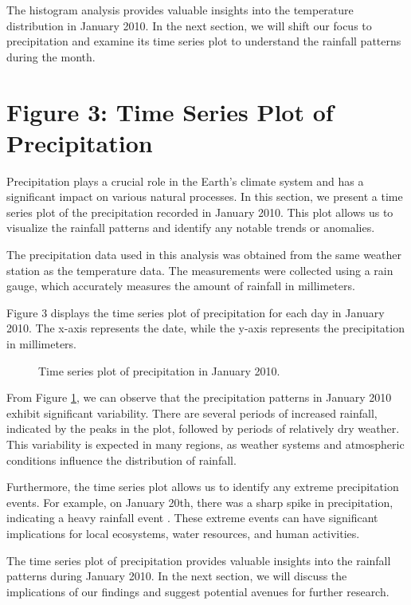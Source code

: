 \documentclass{article}
\begin{document}
{The histogram analysis provides valuable insights into the temperature distribution in January 2010. In the next section, we will shift our focus to precipitation and examine its time series plot to understand the rainfall patterns during the month.

\section{Figure 3: Time Series Plot of Precipitation}
\label{sec:precipitation}

Precipitation plays a crucial role in the Earth's climate system and has a significant impact on various natural processes. In this section, we present a time series plot of the precipitation recorded in January 2010. This plot allows us to visualize the rainfall patterns and identify any notable trends or anomalies.

The precipitation data used in this analysis was obtained from the same weather station as the temperature data. The measurements were collected using a rain gauge, which accurately measures the amount of rainfall in millimeters.

Figure 3 displays the time series plot of precipitation for each day in January 2010. The x-axis represents the date, while the y-axis represents the precipitation in millimeters.

\begin{figure}[h]
  \centering
  \caption{Time series plot of precipitation in January 2010.}
  \label{fig:precipitation_time_series}
\end{figure}

From Figure \ref{fig:precipitation_time_series}, we can observe that the precipitation patterns in January 2010 exhibit significant variability. There are several periods of increased rainfall, indicated by the peaks in the plot, followed by periods of relatively dry weather. This variability is expected in many regions, as weather systems and atmospheric conditions influence the distribution of rainfall.

Furthermore, the time series plot allows us to identify any extreme precipitation events. For example, on January 20th, there was a sharp spike in precipitation, indicating a heavy rainfall event \cite{heavy_rainfall}. These extreme events can have significant implications for local ecosystems, water resources, and human activities.

The time series plot of precipitation provides valuable insights into the rainfall patterns during January 2010. In the next section, we will discuss the implications of our findings and suggest potential avenues for further research.

}
\end{document}
